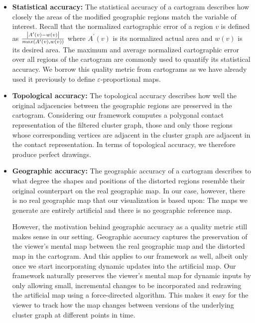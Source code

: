 \begin{itemize}
\item \textbf{Statistical accuracy:}
The statistical accuracy of a cartogram describes how closely the areas of the modified geographic regions match the variable of interest.
Recall that the normalized cartographic error of a region $v$ is defined as $\frac{\left\lvert A^\prime(v)-w(v)\right\rvert}{max(A^\prime(v),w(v))}$ where $A^\prime(v)$ is its normalized actual area and $w(v)$ is its desired area.
The maximum and average normalized cartographic error over all regions of the cartogram are commonly used to quantify its statistical accuracy.
We borrow this quality metric from cartograms as we have already used it previously to define $\varepsilon$-proportional maps.

\item \textbf{Topological accuracy:}
The topological accuracy describes how well the original adjacencies between the geographic regions are preserved in the cartogram.
Considering our framework computes a polygonal contact representation of the filtered cluster graph, those and only those regions whose corresponding vertices are adjacent in the cluster graph are adjacent in the contact representation.
In terms of topological accuracy, we therefore produce perfect drawings.

\item \textbf{Geographic accuracy:}
The geographic accuracy of a cartogram describes to what degree the shapes and positions of the distorted regions resemble their original counterpart on the real geographic map.
In our case, however, there is no real geographic map that our visualization is based upon:
The maps we generate are entirely artificial and there is no geographic reference map.

However, the motivation behind geographic accuracy as a quality metric still makes sense in our setting.
Geographic accuracy captures the preservation of the viewer's mental map between the real geographic map and the distorted map in the cartogram.
And this applies to our framework as well, albeit only once we start incorporating dynamic updates into the artificial map.
Our framework naturally preserves the viewer's mental map for dynamic inputs by only allowing small, incremental changes to be incorporated and redrawing the artificial map using a force-directed algorithm.
This makes it easy for the viewer to track how the map changes between versions of the underlying cluster graph at different points in time.
\end{itemize}



